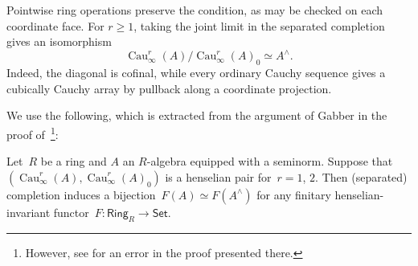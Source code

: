 \documentclass[11pt,a4paper]{amsart}
\newcommand{\cref}[1]{\zcref{#1}}
\numberwithin{equation}{section}
\theoremstyle{plain}
\theoremstyle{definition}
\theoremstyle{remark}
\newcommand{\Cau}{\operatorname{Cau}}
\newcommand{\Cat}[1]{\mathsf{#1}}
\begin{document}
Pointwise ring operations preserve the condition, as may be checked on
each coordinate face.
For \(r\geq1\), taking the joint limit in the separated
completion gives an isomorphism
\begin{equation*}
  \Cau^{r}_{\infty}(A)/\Cau^{r}_{\infty}(A)_{0}\simeq A^{\wedge}.
\end{equation*}
Indeed, the diagonal is cofinal,
while every ordinary Cauchy sequence gives a cubically Cauchy array
by pullback along a coordinate projection.

We use the following,
which is extracted
from the argument of Gabber in
the proof of~\cite[Theorem~2.1.15]{BouthierCesnavicius22}\footnote{However,
  see \cref{xxf2s8} for an error in the proof
  presented there.
}:

\begin{proposition}[Gabber]\label{gabber}
  Let~\(R\) be a ring
  and \(A\) an \(R\)-algebra
  equipped with a seminorm.
  Suppose that \((\Cau^{r}_{\infty}(A),\Cau^{r}_{\infty}(A)_{0})\)
  is a henselian pair for~\(r=1\), \(2\).
  Then (separated) completion induces a bijection~\(F(A)\simeq F(A^{\wedge})\)
  for any finitary henselian-invariant functor~\(F\colon\Cat{Ring}_{R}\to\Cat{Set}\).
\end{proposition}
\end{document}
